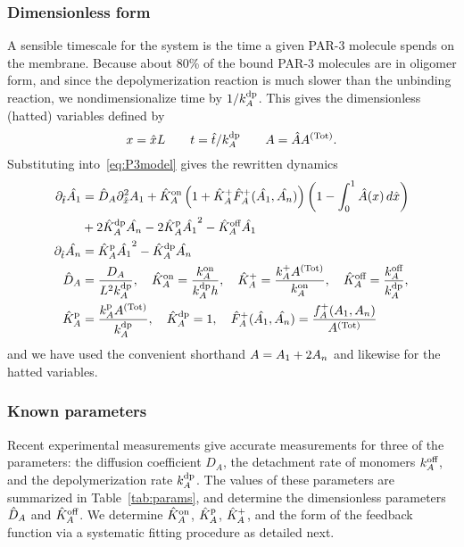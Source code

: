 \documentclass[11pt]{article}
\newcommand{\6}[1]{#1_{\text{6}}}
\newcommand{\3}[1]{#1_{\text{3}}}
\newcommand{\Tot}[1]{#1^\text{(Tot)}}
\newcommand{\A}[1]{#1_A}
\begin{document}
\subsubsection{Dimensionless form}
A sensible timescale for the system is the time a given PAR-3 molecule spends on the membrane. Because about 80\% of the bound PAR-3 molecules are in oligomer form, and since the depolymerization reaction is much slower than the unbinding reaction, we nondimensionalize time by $1/\A{\kdp}$. This gives the dimensionless (hatted) variables defined by
\begin{equation*}
x = \hat{x} L \qquad t= \hat{t}/\A{\kdp} \qquad A= \hat{A}\Tot{A}.
\end{equation*}
Substituting into\ \eqref{eq:P3model} gives the rewritten dynamics
\begin{subequations}
\label{eq:PAR3gen}
\begin{align}
\nonumber
\Dthat \hat{\MA} & = \DhatA \Dxhat^2 \MA +\KhatonA \left(1+\KhatfA \hat F_A^+(\hat \MA, \hat \PA) \right)\left(1 - \int_0^1 \hat A(x) \, d\hat{x} \right) \\ 
\label{eq:Amono} &+ 2\KhatdpA \hat{\PA}-2\KhatpA \hat{\MA}^2 - \KhatoffA \hat{\MA} \\
\label{eq:Apoly}
\Dthat \hat{\PA} & =\KhatpA \hat{\MA}^2- \KhatdpA \hat{\PA} \\ 
\label{eq:paramsND}
\DhatA &=\frac{\A{D}}{L^2 \A{\kdp}}, \quad \KhatonA=\frac{\A{\kon}}{\A{\kdp} h }, \quad \KhatfA = \frac{\A{\kf}\Tot{A}}{\A{\kon}}, \quad  \KhatoffA = \frac{\A{\koff}}{\A{\kdp}}, \\ \nonumber \KhatpA &= \frac{\A{\kp} \Tot{A}}{\A{\kdp}}, \quad \KhatdpA=1, \quad \hat F_A^+(\hat \MA,\hat \PA) =\frac{\A{f}^+(\MA,\PA)}{\Tot{A}}
\end{align}
\end{subequations}
and we have used the convenient shorthand $A=A_1 + 2 A_n$ and likewise for the hatted variables. 

\subsubsection{Known parameters}
Recent experimental measurements \cite{lang2023oligomerization} give accurate measurements for three of the parameters: the diffusion coefficient $D_A$, the detachment rate of monomers $k^\text{off}_A$, and the depolymerization rate $k^\text{dp}_A$. The values of these parameters are summarized in Table\ \ref{tab:params}, and determine the dimensionless parameters $\hat{D}_A$ and $\hat{K}^\text{off}_A$. We determine $\hat{K}^\text{on}_A$, $\hat{K}^\text{p}_A$, $\hat{K}^\text{+}_A$, and the form of the feedback function via a systematic fitting procedure as detailed next.
\end{document}
